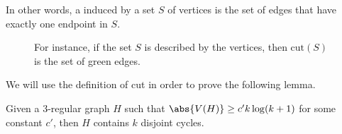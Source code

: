 \documentclass[a4paper, 12pt]{report}
\begin{document}
    In other words, a  induced by a set $S$ of vertices is the set of edges that have exactly one endpoint in $S$.

    \begin{figure}[H]
        \centering
        \caption{For instance, if the set $S$ is described by the  vertices, then $\mathrm{cut}(S)$ is the set of green edges.}
    \end{figure}

    We will use the definition of cut in order to prove the following lemma.

    \begin{framedlem}{}
        Given a 3-regular graph $H$ such that $\abs{V(H)} \ge c'k \log (k +1)$ for some constant $c'$, then $H$ contains $k$ disjoint cycles.
    \end{framedlem}
\end{document}
